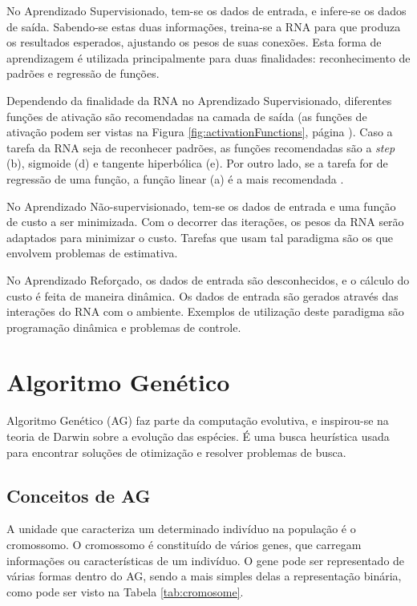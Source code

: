 \documentclass[
	12pt,					%
	openright,				%
	oneside,				%
	a4paper,				%
	bibjustif,				%
	chapter=TITLE,			%
	english,				%
	brazil,					%
	]{abntex2}
\begin{document}
	No Aprendizado Supervisionado,
	tem-se os dados de entrada, e infere-se os dados de saída.
	Sabendo-se estas duas informações, treina-se a RNA para que produza os resultados esperados,
	ajustando os pesos de suas conexões.
	Esta forma de aprendizagem é utilizada principalmente para duas finalidades:
	reconhecimento de padrões e regressão de funções.
	
	Dependendo da finalidade da RNA no Aprendizado Supervisionado,
	diferentes funções de ativação são recomendadas na camada de saída
	(as funções de ativação podem ser vistas na Figura \ref{fig:activationFunctions}, página \pageref{fig:activationFunctions}).
	Caso a tarefa da RNA seja de reconhecer padrões,
	as funções recomendadas são a \textit{step} (b), sigmoide (d) e tangente hiperbólica (e).
	Por outro lado, se a tarefa for de regressão de uma função,
	a função linear (a) é a mais recomendada \cite{researchGate}.
	
	No Aprendizado Não-supervisionado,
	tem-se os dados de entrada e uma função de custo a ser minimizada.
	Com o decorrer das iterações,
	os pesos da RNA serão adaptados para minimizar o custo.
	Tarefas que usam tal paradigma são os que envolvem problemas de estimativa.
	
	No Aprendizado Reforçado,
	os dados de entrada são desconhecidos,
	e o cálculo do custo é feita de maneira dinâmica.
	Os dados de entrada são gerados através das interações do RNA com o ambiente.
	Exemplos de utilização deste paradigma são
	programação dinâmica e problemas de controle.

	\FloatBarrier
	\section{Algoritmo Genético}
	Algoritmo Genético (AG) faz parte da computação evolutiva,
	e inspirou-se na teoria de Darwin sobre a evolução das espécies.
	É uma busca heurística usada para encontrar soluções de otimização e resolver problemas de busca.
	
	\FloatBarrier
	\subsection{Conceitos de AG}
	A unidade que caracteriza um determinado indivíduo na população é o cromossomo.
	O cromossomo é constituído de vários genes,
	que carregam informações ou características de um indivíduo. %
	O gene pode ser representado de várias formas dentro do AG,
	sendo a mais simples delas a representação binária,
	como pode ser visto na Tabela \ref{tab:cromosome}.
	
\end{document}
